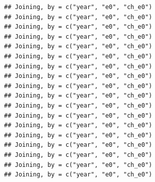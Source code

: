 \documentclass[]{article}
\newenvironment{Shaded}{\begin{snugshade}}{\end{snugshade}}
\newcommand{\KeywordTok}[1]{\textcolor[rgb]{0.13,0.29,0.53}{\textbf{#1}}}
\newcommand{\DataTypeTok}[1]{\textcolor[rgb]{0.13,0.29,0.53}{#1}}
\newcommand{\DecValTok}[1]{\textcolor[rgb]{0.00,0.00,0.81}{#1}}
\newcommand{\StringTok}[1]{\textcolor[rgb]{0.31,0.60,0.02}{#1}}
\newcommand{\OperatorTok}[1]{\textcolor[rgb]{0.81,0.36,0.00}{\textbf{#1}}}
\newcommand{\NormalTok}[1]{#1}
\begin{document}
\begin{Shaded}
\end{Shaded}

\begin{verbatim}
## Joining, by = c("year", "e0", "ch_e0")
## Joining, by = c("year", "e0", "ch_e0")
## Joining, by = c("year", "e0", "ch_e0")
## Joining, by = c("year", "e0", "ch_e0")
## Joining, by = c("year", "e0", "ch_e0")
## Joining, by = c("year", "e0", "ch_e0")
## Joining, by = c("year", "e0", "ch_e0")
## Joining, by = c("year", "e0", "ch_e0")
## Joining, by = c("year", "e0", "ch_e0")
## Joining, by = c("year", "e0", "ch_e0")
## Joining, by = c("year", "e0", "ch_e0")
## Joining, by = c("year", "e0", "ch_e0")
## Joining, by = c("year", "e0", "ch_e0")
## Joining, by = c("year", "e0", "ch_e0")
## Joining, by = c("year", "e0", "ch_e0")
## Joining, by = c("year", "e0", "ch_e0")
## Joining, by = c("year", "e0", "ch_e0")
## Joining, by = c("year", "e0", "ch_e0")
\end{verbatim}
\end{document}
